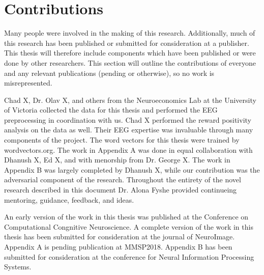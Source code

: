 \section{Contributions}

Many people were involved in the making of this research. Additionally, much of 
this research has been published or submitted for consideration at a publisher.  
This thesis will therefore include components which have been published or were 
done by other researchers. This section will outline the contributions of 
everyone and any relevant publications (pending or otherwise), so no work is 
misrepresented.

Chad X, Dr. Olav X, and others from the Neuroeconomics Lab at the University of 
Victoria collected the data for this thesis and performed the EEG preprocessing 
in coordination with us. Chad X performed the reward positivity analysis on the 
data as well. Their EEG expertise was invaluable through many components of the 
project. The word vectors for this thesis were trained by wordvectors.org. The 
work in Appendix A was done in equal collaboration with Dhanush X, Ed X, and 
with menorship from Dr. George X. The work in Appendix B was largely completed 
by Dhanush X, while our contribution was the adversarial component of the 
research. Throughout the entirety of the novel research described in this 
document Dr. Alona Fyshe provided continueing mentoring, guidance, feedback, 
and ideas.

An early version of the work in this thesis was published at the Conference on 
Computational Congnitive Neuroscience. A complete version of the work in this 
thesis has been submitted for consideration at the journal of NeuroImage.  
Appendix A is pending publication at MMSP2018. Appendix B has been submitted 
for consideration at the conference for Neural Information Processing Systems.

